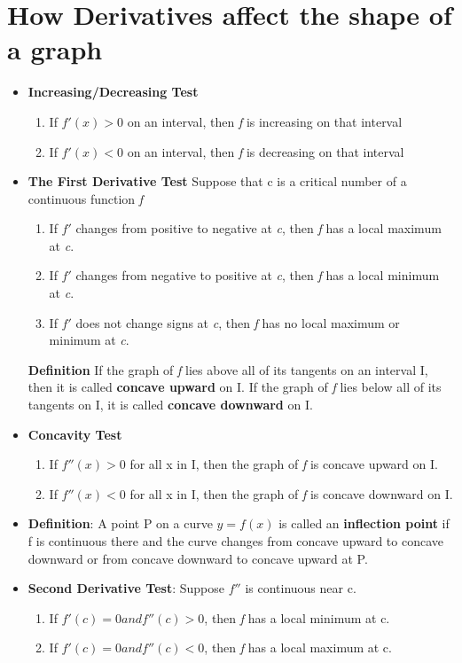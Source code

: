\documentclass{report}
\begin{document}
		\section{How Derivatives affect the shape of a graph}
			\begin{itemize}\addtolength{\leftskip}{2em}
				\item \textbf{Increasing/Decreasing Test}
				\begin{enumerate}\addtolength{\leftskip}{4em}
				\item If $f'(x)>0$ on an interval, then \textit{f} is increasing on that interval
				\item If $f'(x)<0$ on an interval, then \textit{f} is decreasing on that interval
				\end{enumerate}
				\item \textbf{The First Derivative Test} Suppose that c is a critical number of a continuous function \textit{f}
				\begin{enumerate}\addtolength{\leftskip}{4em}
				\item If $f'$ changes from positive to negative at \textit{c}, then \textit{f} has a local maximum at \textit{c}.
				\item If $f'$ changes from negative to positive at \textit{c}, then \textit{f} has a local minimum at \textit{c}.
				\item If $f'$ does not change signs at \textit{c}, then \textit{f} has no local maximum or minimum at \textit{c}.
				\end{enumerate}
				\textbf{Definition} If the graph of \textit{f} lies above all of its tangents on an interval I, then it is called \textbf{concave upward} on I. If the graph of \textit{f} lies below all of its tangents on I, it is called \textbf{concave downward} on I.
				\item \textbf{Concavity Test} 
				\begin{enumerate}\addtolength{\leftskip}{4em}
				\item If $f''(x)>0$ for all x in I, then the graph of \textit{f} is concave upward on I.
				\item If $f''(x)<0$ for all x in I, then the graph of \textit{f} is concave downward on I.
				\end{enumerate}
				\item \textbf{Definition}: A point P on a curve $y=f(x)$ is called an \textbf{inflection point} if f is continuous there and the curve changes from concave upward to concave downward or from concave downward to concave upward at P.
				\item \textbf{Second Derivative Test}: Suppose $f''$ is continuous near c.
				\begin{enumerate}
				\item If $f'(c)=0 and f''(c)>0$, then \textit{f} has a local minimum at c.
				\item If $f'(c)=0 and f''(c)<0$, then \textit{f} has a local maximum at c.
				\end{enumerate}
			\end{itemize}
\end{document}
